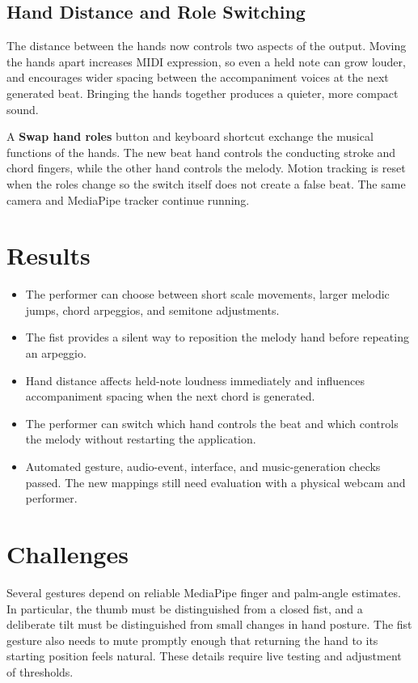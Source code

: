 \documentclass[11pt,a4paper]{article}
\begin{document}
\subsection{Hand Distance and Role Switching}

The distance between the hands now controls two aspects of the output.
Moving the hands apart increases MIDI expression, so even a held note can
grow louder, and encourages wider spacing between the accompaniment voices
at the next generated beat. Bringing the hands together produces a quieter,
more compact sound.

A \textbf{Swap hand roles} button and keyboard shortcut exchange the musical
functions of the hands. The new beat hand controls the conducting stroke and
chord fingers, while the other hand controls the melody. Motion tracking is
reset when the roles change so the switch itself does not create a false beat.
The same camera and MediaPipe tracker continue running.

\section{Results}

\begin{itemize}
    \item The performer can choose between short scale movements, larger
    melodic jumps, chord arpeggios, and semitone adjustments.
    \item The fist provides a silent way to reposition the melody hand before
    repeating an arpeggio.
    \item Hand distance affects held-note loudness immediately and influences
    accompaniment spacing when the next chord is generated.
    \item The performer can switch which hand controls the beat and which
    controls the melody without restarting the application.
    \item Automated gesture, audio-event, interface, and music-generation
    checks passed. The new mappings still need evaluation with a physical
    webcam and performer.
\end{itemize}

\section{Challenges}

Several gestures depend on reliable MediaPipe finger and palm-angle estimates.
In particular, the thumb must be distinguished from a closed fist, and a
deliberate tilt must be distinguished from small changes in hand posture.
The fist gesture also needs to mute promptly enough that returning the hand
to its starting position feels natural. These details require live testing
and adjustment of thresholds.
\end{document}
